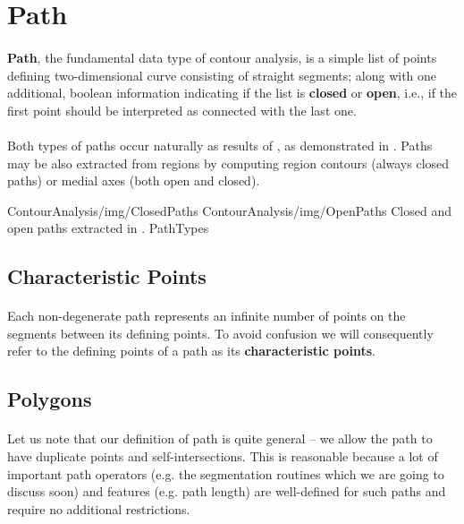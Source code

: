 \section{Path}

\paragraph*{}
\textbf{Path}, the fundamental data type of contour analysis, is a simple list of points defining two-dimensional curve consisting of straight segments; along with one additional, boolean information indicating if the list is \textbf{closed} or \textbf{open}, i.e., if the first point should be interpreted as connected with the last one.

\paragraph*{}
Both types of paths occur naturally as results of , as demonstrated in . Paths may be also extracted from regions by computing region contours (always closed paths) or medial axes (both open and closed).

\twoFigures
{ContourAnalysis/img/ClosedPaths}
{ContourAnalysis/img/OpenPaths}
{Closed and open paths extracted in .}
{PathTypes}
{\basicWidth}

\subsection{Characteristic Points}

\paragraph*{}
Each non-degenerate path represents an infinite number of points on the segments between its defining points. To avoid confusion we will consequently refer to the defining points of a path as its \textbf{characteristic points}.

\subsection{Polygons}

\paragraph*{}
Let us note that our definition of path is quite general -- we allow the path to have duplicate points and self-intersections. This is reasonable because a lot of important path operators (e.g. the segmentation routines which we are going to discuss soon) and features (e.g. path length) are well-defined for such paths and require no additional restrictions.

